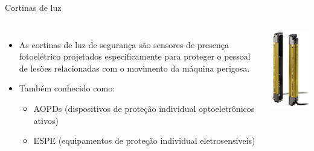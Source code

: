 \documentclass[aspectratio=169,
				xcolor=table]{beamer}
\begin{document}
		\begin{frame}{Cortinas de luz}
			\begin{columns}
				\begin{itemize}
					\item As cortinas de luz de segurança são sensores de presença fotoelétrico projetados especificamente para proteger o pessoal de lesões relacionadas com o movimento da máquina perigosa. 
				\vspace{0.8cm}
					\item Também conhecido como: 
					\begin{itemize}
						\item AOPDs (dispositivos de proteção individual optoeletrônicos ativos)  
						\item ESPE (equipamentos de proteção individual eletrosensiveis)
					\end{itemize}
				\end{itemize}
				\includegraphics[scale=.4]{../figs/cap03/Imagem30}
	
			\end{columns}
		\end{frame}
	
	
\end{document}
